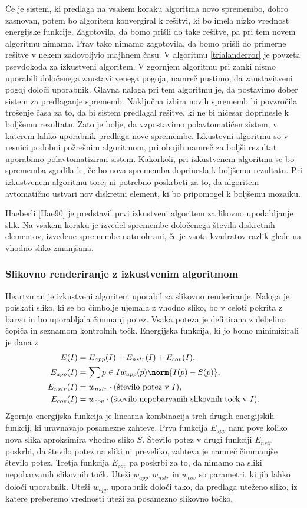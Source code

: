 Če je sistem, ki predlaga na vsakem koraku algoritma novo spremembo, dobro zasnovan, potem bo algoritem konvergiral k rešitvi, ki bo imela nizko vrednost energijske funkcije. Zagotovila, da bomo prišli do take rešitve, pa pri tem novem algoritmu nimamo. Prav tako nimamo zagotovila, da bomo prišli do primerne rešitve v nekem zadovoljvio majhnem času. V algoritmu \ref{trialanderror} je povzeta psevdokoda za izkustveni algoritem.
%
%
V zgornjem algoritmu pri zanki nismo uporabili določenega zaustavitvenega pogoja, namreč pustimo, da zaustavitveni pogoj določi uporabnik. Glavna naloga pri tem algoritmu je, da postavimo dober sistem za predlaganje sprememb. Naključna izbira novih sprememb bi povzročila trošenje časa za to, da bi sistem predlagal rešitve, ki ne bi ničesar doprinesle k boljšemu rezultatu. Zato je bolje, da vzpostavimo polavtomatičen sistem, v katerem lahko uporabnik predlaga nove spremembe. Izkustevni algoritmu so v resnici podobni požrešnim algoritmom, pri obojih namreč za boljši rezultat uporabimo polavtomatiziran sistem. Kakorkoli, pri izkustvenem algoritmu se bo sprememba zgodila le, če bo nova sprememba doprinesla k boljšemu rezultatu. Pri izkustvenem algoritmu torej ni potrebno poskrbeti za to, da algoritem avtomatično ustvari nov diskretni element, ki bo pripomogel k boljšemu mozaiku.

Haeberli \ref{Hae90} je predstavil prvi izkustveni algoritem za likovno upodabljanje slik. Na vsakem koraku je izvedel spremembe določenega števila diskretnih elementov, izvedene spremembe nato ohrani, če je vsota kvadratov razlik glede na vhodno sliko zmanjšana.   
%
\subsubsection{Slikovno renderiranje z izkustvenim algoritmom}
Heartzman je izkustveni algoritem uporabil za slikovno renderiranje. Naloga je poiskati sliko, ki se bo čimbolje ujemala z vhodno sliko, bo v celoti pokrita z barvo in bo uporabljala čimmanj potez. Vsaka poteza je definirana z debelino čopiča in seznamom kontrolnih točk. Energijska funkcija, ki jo bomo minimizirali je dana z
%
\begin{align*}
E(I) & = E_{app}(I) + E_{nstr}(I) + E_{cov}(I), \\
E_{app}(I) & = \sum{p \in I} w_{app}(p) \norm{I(p) - S(p)}, \\
E_{nstr}(I) & = w_{nstr} \cdot \textup{(število potez v $I$)}, \\
E_{cov}(I) & = w_{cov} \cdot \textup{(število nepobarvanih slikovnih točk v $I$)}.
\end{align*}
%
Zgornja energijska funkcija je linearna kombinacija treh drugih energijskih funkcij, ki uravnavajo posamezne zahteve. Prva funkcija $E_{app}$ nam pove koliko nova slika aproksimira vhodno sliko $S$. Število potez v drugi funkciji $E_{nstr}$ poskrbi, da število potez na sliki ni preveliko, zahteva je namreč čimmanjše število potez. Tretja funkcija $E_{cov}$ pa poskrbi za to, da nimamo na sliki nepobarvanih slikovnih točk. Uteži $w_{app}, w_{nstr}$ in $w_{cov}$ so parametri, ki jih lahko določi uporabnik. Uteži $w_{app}$ uporabnik določi tako, da predlaga uteženo sliko, iz katere preberemo vrednosti uteži za posamezno slikovno točko.

